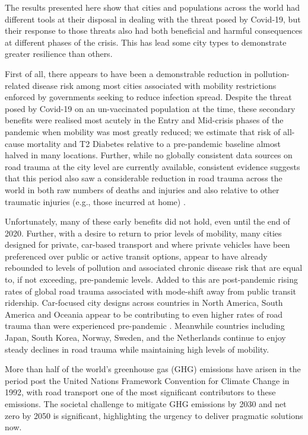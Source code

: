 \documentclass[preprint,12pt]{elsarticle}
\begin{document}
The results presented here show that cities and populations across the world had different tools at their disposal in dealing with the threat posed by Covid-19, but their response to those threats also had both beneficial and harmful consequences at different phases of the crisis. This has lead some city types to demonstrate greater resilience than others.

First of all, there appears to have been a demonstrable reduction in pollution-related disease risk among most cities associated with mobility restrictions  enforced by governments seeking to reduce infection spread. Despite the threat posed by Covid-19 on an un-vaccinated population at the time, these secondary benefits were realised most acutely in the Entry and Mid-crisis phases of the pandemic when mobility was most greatly reduced; we estimate that risk of all-cause mortality and T2 Diabetes relative to a pre-pandemic baseline almost halved in many locations. Further, while no globally consistent data sources on road trauma at the city level are currently available, consistent evidence suggests that this period also saw a considerable reduction in road trauma across the world in both raw numbers of deaths and injuries \cite{saladie2023back} and also relative to other traumatic injuries (e.g., those incurred at home) \cite{WASEEM2021200}.

Unfortunately, many of these early benefits did not hold, even until the end of 2020. Further, with a desire to return to prior levels of mobility, many cities designed for private, car-based transport and where private vehicles have been preferenced over public or active transit options\cite{DAS20211}, appear to have already rebounded to levels of pollution and associated chronic disease risk that are equal to, if not exceeding, pre-pandemic levels. Added to this are post-pandemic rising rates of global road trauma associated with mode-shift away from  public transit ridership. Car-focused city designs across countries in North America, South America and Oceania appear to be contributing to even higher rates of road trauma than were experienced pre-pandemic \cite{ITFRS}. Meanwhile countries including Japan, South Korea, Norway, Sweden, and the Netherlands continue to enjoy steady declines in road trauma while maintaining high levels of mobility. 


More than half of the world's greenhouse gas (GHG) emissions have arisen in the period post the United Nations Framework Convention for Climate Change in 1992\cite{bashmakov2022climate}, with road transport one of the most significant contributors to these emissions. The societal challenge to mitigate GHG emissions by 2030 and net zero by 2050\cite{lynskey2020moving} is significant, highlighting the urgency to deliver pragmatic solutions now.
\end{document}
